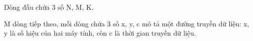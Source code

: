 Dòng đầu chứa 3 số N, M, K.  

   M dòng tiếp theo, mỗi dòng chứa 3 số x, y, c mô tả một đường truyền dữ liệu: x, y là số hiệu của hai máy tính, còn c là thời gian truyền dữ liệu.